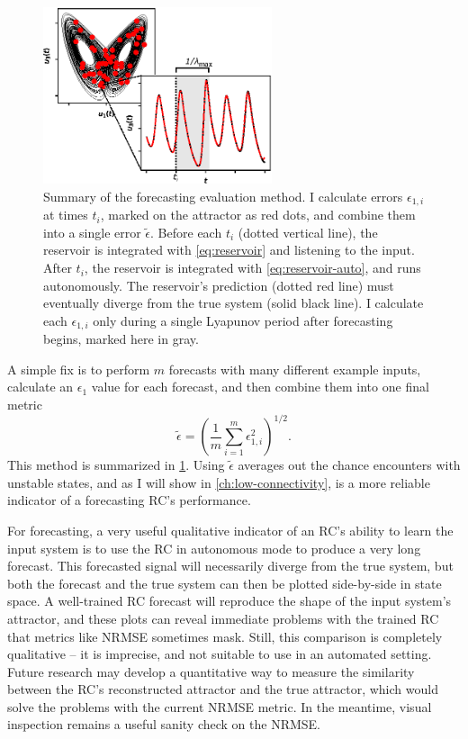 \begin{figure}
  \includegraphics[width=0.6\textwidth]{figures/nrmse-avg}
  \caption{Summary of the forecasting evaluation method. I calculate
    errors $\epsilon_{1,i}$ at times $t_i$, marked on the attractor as
    red dots, and combine them into a single error
    $\tilde{\epsilon}$. Before each $t_i$ (dotted vertical line), the
    reservoir is integrated with \cref{eq:reservoir} and listening to
    the input. After $t_i$, the reservoir is integrated with
    \cref{eq:reservoir-auto}, and runs autonomously. The reservoir's
    prediction (dotted red line) must eventually diverge from the true
    system (solid black line). I calculate each $\epsilon_{1,i}$ only
    during a single Lyapunov period after forecasting begins, marked
    here in gray.}%
  \label{fig:nrmse-avg}
\end{figure}

A simple fix is to perform $m$ forecasts with many different example
inputs, calculate an $\epsilon_1$ value for each forecast, and then
combine them into one final metric
\begin{equation}
  \label{eq:nrmse-avg}
  \tilde{\epsilon} = {\left( \frac{1}{m} \sum_{i=1}^m \epsilon_{1,i}^2 \right)}^{1/2}.
\end{equation}
This method is summarized in \cref{fig:nrmse-avg}.
Using $\tilde{\epsilon}$ averages out the chance encounters with
unstable states, and as I will show in \cref{ch:low-connectivity}, is
a more reliable indicator of a forecasting RC's performance.

For forecasting, a very useful qualitative indicator of an RC's ability
to learn the input system is to use the RC in autonomous mode to
produce a very long forecast. This forecasted signal will necessarily
diverge from the true system, but both the forecast and the true
system can then be plotted side-by-side in state space. A well-trained
RC forecast will reproduce the shape of the input system's attractor,
and these plots can reveal immediate problems with the trained RC that
metrics like NRMSE sometimes mask. Still, this comparison is
completely qualitative -- it is imprecise, and not suitable to use in
an automated setting. Future research may develop a quantitative way
to measure the similarity between the RC's reconstructed attractor and
the true attractor, which would solve the problems with the current
NRMSE metric. In the meantime, visual inspection remains a useful
sanity check on the NRMSE.

